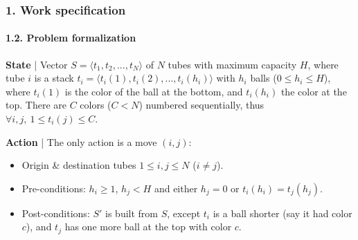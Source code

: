 \documentclass{beamer}
\begin{document}
\begin{frame}
\frametitle{1. Work specification}
\framesubtitle{1.2. Problem formalization}

\textbf{State} | Vector $S = \langle t_1, t_2, ..., t_N \rangle$ of $N$ tubes with maximum capacity $H$, where tube $i$ is a stack $t_i = \langle t_i(1), t_i(2), ..., t_i(h_i) \rangle$ with $h_i$ balls ($0 \leq h_i \leq H$), where $t_i(1)$ is the color of the ball at the bottom, and $t_i(h_i)$ the color at the top. There are $C$ colors ($C < N$) numbered sequentially, thus $\forall i, j,~1 \leq t_i(j) \leq C$.

\textbf{Action} | The only action is a move $(i,j)$:
\begin{itemize}
  \item Origin \& destination tubes $1 \leq i, j \leq N$ ($i \neq j$).
  \item Pre-conditions: $h_i \geq 1$, $h_j < H$ and either $h_j = 0$ or $t_i(h_i)=t_j(h_j)$.
  \item Post-conditions: $S'$ is built from $S$, except $t_i$ is a ball shorter (say it had color $c$), and $t_j$ has one more ball at the top with color $c$.
\end{itemize}


\end{frame}
\end{document}

